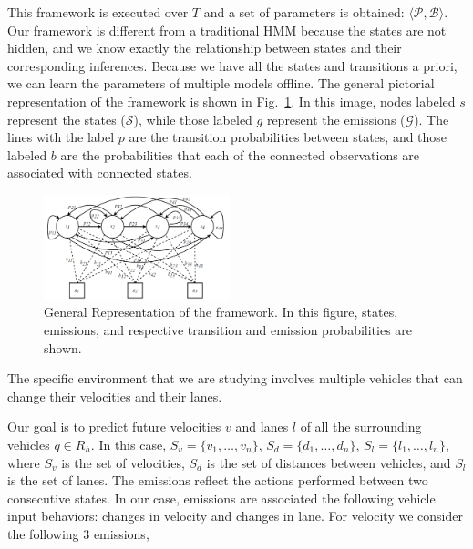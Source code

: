 \documentclass[letterpaper, 10 pt, conference]{ieeeconf}  %
\newcommand\NB[1]{$\spadesuit$\footnote{NB: #1}}
\newcommand\RP[1]{$\clubsuit$\footnote{RP: #1}}
\begin{document}
This framework is executed over $T$ and a set of parameters is obtained: $\langle \mathcal{P}, \mathcal{B} \rangle$. Our framework is different from a traditional HMM because the states are not hidden, and we know exactly the relationship %
between states and their corresponding inferences. Because we have all the states and transitions a priori, we can learn the parameters of multiple models offline. %
The general pictorial representation of the framework is shown in Fig.~\ref{fig:hmm}. %
In this image, nodes labeled $s$ represent the states ($\mathcal{S}$), while those labeled $g$ represent the emissions ($\mathcal{G}$). The lines with the label $p$ are the transition probabilities between states, and those labeled $b$ are the probabilities that each of the connected observations are associated with connected states.
\begin{figure}[h]
    \includegraphics[width=0.48\textwidth]{fig/hmm.png}
    \caption{General Representation of the framework. In this figure, states, emissions, and respective transition and emission probabilities are shown.}
    \label{fig:hmm}
\end{figure}

The specific environment that we are studying involves multiple vehicles that can change their velocities and their lanes.%

Our goal is to predict future velocities $v$ and lanes $l$ of all the surrounding vehicles $q\in R_h$. In this case, $S_v = \{v_1,\ldots, v_n\}$, $S_d = \{d_1,\ldots,d_n\}$, $S_l = \{l_1,\ldots,l_n\}$, where $S_v$ is the set of velocities, $S_d$ is the set of distances between vehicles, and $S_l$ is the set of lanes. The emissions reflect the actions performed between two consecutive states. In our case, emissions are associated the following vehicle input behaviors: changes in velocity and changes in lane. %
For velocity we consider the following 3 emissions,
    
\end{document}
